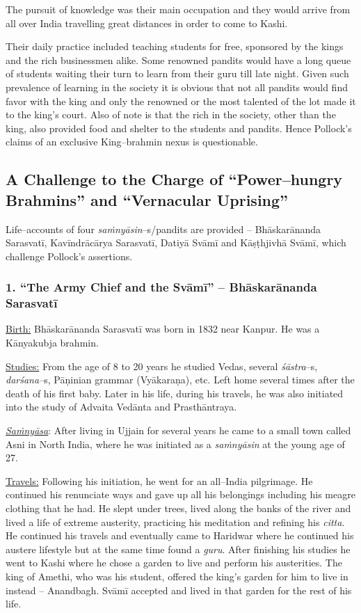 The pursuit of knowledge was their main occupation and they would arrive from all over India travelling great distances in order to come to Kashi.

Their daily practice included teaching students for free, sponsored by the kings and the rich businessmen alike. Some renowned pandits would have a long queue of students waiting their turn to learn from their guru till late night. Given such prevalence of learning in the society it is obvious that not all pandits would find favor with the king and only the renowned or the most talented of the lot made it to the king’s court. Also of note is that the rich in the society, other than the king, also provided food and shelter to the students and pandits. Hence Pollock’s claims of an exclusive King–brahmin nexus is questionable.


\subsection*{A Challenge to the Charge of “Power–hungry Brahmins” and “Vernacular Uprising”}

Life–accounts of four \textit{saṁnyāsin}–s/pandits are provided – Bhāskarānanda Sarasvatī, Kavīndrācārya Sarasvatī, Datiyā Svāmī and Kāṣṭhjivhā Svāmī, which challenge Pollock’s assertions.

\subsubsection*{1. “The Army Chief and the Svāmī” – \textbf{Bhāskarānanda Sarasvatī}\protect{}}

\underline{Birth:} Bhāskarānanda Sarasvatī was born in 1832 near Kanpur. He was a Kānyakubja brahmin.

\underline{Studies:} From the age of 8 to 20 years he studied Vedas, several \textit{śāstra}–s, \textit{darśana–}s, Pāṇinian grammar (Vyākaraṇa), etc. Left home several times after the death of his first baby. Later in his life, during his travels, he was also initiated into the study of Advaita Vedānta and Prasthāntraya.

\textit{\underline{Saṁnyāsa}}: After living in Ujjain for several years he came to a small town called Asni in North India, where he was initiated as a \textit{saṁnyāsin} at the young age of 27.

\underline{Travels:} Following his initiation, he went for an all–India pilgrimage. He continued his renunciate ways and gave up all his belongings including his meagre clothing that he had. He slept under trees, lived along the banks of the river and lived a life of extreme austerity, practicing his meditation and refining his \textit{citta}. He continued his travels and eventually came to Haridwar where he continued his austere lifestyle but at the same time found a \textit{guru}. After finishing his studies he went to Kashi where he chose a garden to live and perform his austerities. The king of Amethi, who was his student, offered the king’s garden for him to live in instead – Anandbagh. Svāmī accepted and lived in that garden for the rest of his life.

